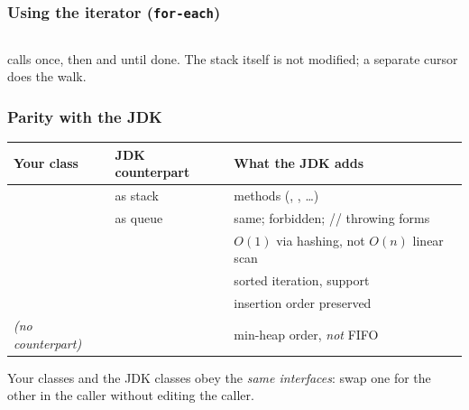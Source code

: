 \documentclass[aspectratio=169,10pt,compress]{beamer}
\begin{document}
\begin{frame}[t,fragile] \frametitle{Using the iterator (\texttt{for-each})}
  \begin{columns}[T]
    \begin{column}{0.52\textwidth}
    \end{column}
    \begin{column}{0.44\textwidth}
    \end{column}
  \end{columns}
  \small
   calls  once, then
   and  until done. The stack itself is
  not modified; a separate cursor does the walk.
\end{frame}




\begin{frame}[t,fragile] \frametitle{Parity with the JDK}
  \begin{center}\footnotesize
  \begin{tabular}{@{}lL{0.20\textwidth}L{0.42\textwidth}@{}}
    \toprule
    \textbf{Your class} & \textbf{JDK counterpart} & \textbf{What the JDK adds} \\
    \midrule
      &  as stack &  methods (, , \ldots) \\
      &  as queue & same;  forbidden; // throwing forms \\
        &           & $O(1)$ via hashing, not $O(n)$ linear scan \\
        &           & sorted iteration,  support \\
        &     & insertion order preserved \\
    \midrule
    \emph{(no counterpart)} &   & min-heap order, \emph{not} FIFO \\
    \bottomrule
  \end{tabular}
  \end{center}
  \vspace{0.3em}
  \small
  Your classes and the JDK classes obey the \emph{same interfaces}:
  swap one for the other in the caller without editing the caller.
\end{frame}
\end{document}
